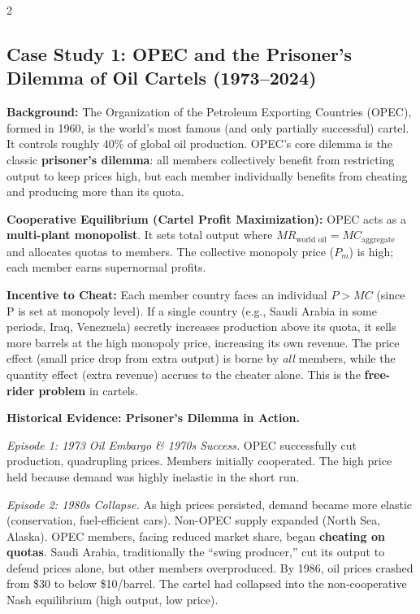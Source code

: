 \documentclass[10pt,a4paper]{article}
\begin{document}
\begin{multicols}{2}
\subsection*{Case Study 1: OPEC and the Prisoner's Dilemma of Oil Cartels (1973--2024)}

\textbf{Background:} The Organization of the Petroleum Exporting Countries (OPEC), formed in 1960, is the world's most famous (and only partially successful) cartel. It controls roughly 40\% of global oil production. OPEC's core dilemma is the classic \textbf{prisoner's dilemma}: all members collectively benefit from restricting output to keep prices high, but each member individually benefits from cheating and producing more than its quota.

\textbf{Cooperative Equilibrium (Cartel Profit Maximization):}
OPEC acts as a \textbf{multi-plant monopolist}. It sets total output where $MR_{\text{world oil}} = MC_{\text{aggregate}}$ and allocates quotas to members. The collective monopoly price ($P_m$) is high; each member earns supernormal profits.

\textbf{Incentive to Cheat:}
Each member country faces an individual $P > MC$ (since P is set at monopoly level). If a single country (e.g., Saudi Arabia in some periods, Iraq, Venezuela) secretly increases production above its quota, it sells more barrels at the high monopoly price, increasing its own revenue. The price effect (small price drop from extra output) is borne by \textit{all} members, while the quantity effect (extra revenue) accrues to the cheater alone. This is the \textbf{free-rider problem} in cartels.

\textbf{Historical Evidence: Prisoner's Dilemma in Action.}

\textit{Episode 1: 1973 Oil Embargo \& 1970s Success.} OPEC successfully cut production, quadrupling prices. Members initially cooperated. The high price held because demand was highly inelastic in the short run.

\textit{Episode 2: 1980s Collapse.} As high prices persisted, demand became more elastic (conservation, fuel-efficient cars). Non-OPEC supply expanded (North Sea, Alaska). OPEC members, facing reduced market share, began \textbf{cheating on quotas}. Saudi Arabia, traditionally the ``swing producer,'' cut its output to defend prices alone, but other members overproduced. By 1986, oil prices crashed from \$30 to below \$10/barrel. The cartel had collapsed into the non-cooperative Nash equilibrium (high output, low price).


\end{multicols}
\end{document}
